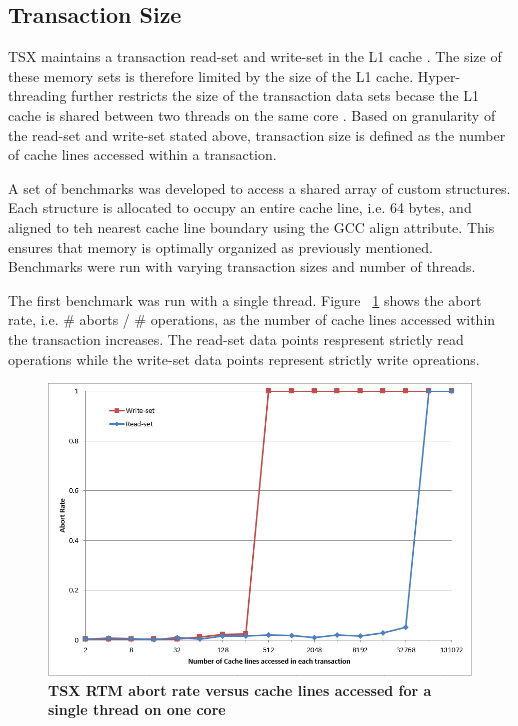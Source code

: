 \documentclass[a4paper]{article}
\begin{document}
\subsection{\textbf{Transaction Size}}

\indent TSX maintains a transaction read-set and write-set in the L1 cache
\cite{intel_opt_man}.  The size of these memory sets is therefore limited by
the size of the L1 cache.  Hyper-threading further restricts the size of the
transaction data sets becase the L1 cache is shared between two threads on the
same core \cite{intel_opt_man}.  Based on granularity of the read-set and write-set stated
above, transaction size is defined as the number of cache lines accessed within
a transaction.\par 

\indent A set of benchmarks was developed to access a shared array of custom structures. Each
structure is allocated to occupy an entire cache line, i.e. 64 bytes, and
aligned to teh nearest cache line boundary using the GCC align attribute.  This
ensures that memory is optimally organized as previously mentioned.  Benchmarks
were run with varying transaction sizes and number of threads.\par

\indent The first benchmark was run with a single thread.  Figure
~\ref{fig:trx_size} shows the abort rate, i.e. \# aborts / \# operations, as the
number of cache lines accessed within the transaction increases.  The read-set
data points respresent strictly read operations while the write-set data points
represent strictly write opreations.\par 

\begin{figure}[H]
    \centering
    \graphicspath{ {./figures/} }
    \includegraphics[width=\textwidth,height=\textheight,keepaspectratio]{trx_size}
    \caption{\textbf{TSX RTM abort rate versus cache lines accessed for a single
    thread on one core}}
    \label{fig:trx_size}
\end{figure}
\end{document}
